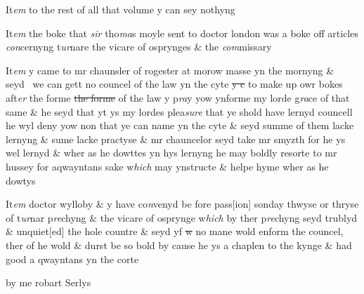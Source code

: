 \documentclass[12pt, a4paper]{book}
\begin{document}
		\ifthenelse{\isodd{\thepage}}
		{\reversemarginpar}
		{\normalmarginpar}
		It\textit{em} to the rest of all that volume y can sey nothyng 

	
		\ifthenelse{\isodd{\thepage}}
		{\reversemarginpar}
		{\normalmarginpar}
		It\textit{em} the boke that \textit{sir} tho\textit{ma}s moyle sent to doctor london was a boke off articles \textit{con}cernyng t\textit{ur}nare the vicare of osprynges \& the\textit{ com}missary 

	
		\ifthenelse{\isodd{\thepage}}
		{\reversemarginpar}
		{\normalmarginpar}
		It\textit{em} y came to mr chaunsler of rogester at morow masse yn the mornyng \& seyd  we can gett no councel of the law yn the cyte \sout{y c} to make up owr bokes aft\textit{er} the forme \sout{the forme} of the law y p\textit{ra}y yow ynforme my lorde g\textit{ra}ce of that same \& he seyd that yt ys my lordes plea\textit{sure }that ye shold have lernyd councell he wyl deny yow non that ye can name yn the cyte \& seyd summe of them lacke lernyng \& sume lacke practyse \& mr chauncelor seyd take mr smyzth for he ys wel lernyd \& wher as he dowttes yn hys lernyng he may boldly resorte to mr hussey for aqwayntans sake w\textit{hich} may ynstructe \& helpe hyme wher as he dowtys
 	

	
		\ifthenelse{\isodd{\thepage}}
		{\reversemarginpar}
		{\normalmarginpar}
		It\textit{em} doctor wylloby \& y have co\textit{n}venyd be fore pass[ion] sonday thwyse or thryse of t\textit{ur}nar p\textit{re}chyng \& the vicare of osprynge w\textit{hich} by ther p\textit{re}chyng seyd trublyd \& unquiet[ed] the hole countre \& seyd yf \sout{w }no mane wold enform the councel, ther of
			 he wold \& durst be so bold by cause he ys a chaplen to the kynge \& had good a qwayntans  yn the corte 
 	
		\ifthenelse{\isodd{\thepage}}
		{\reversemarginpar}
		{\normalmarginpar}
		by me robart Serlys

\dotfill
					  \section*{}  \subsection*{}
\end{document}
